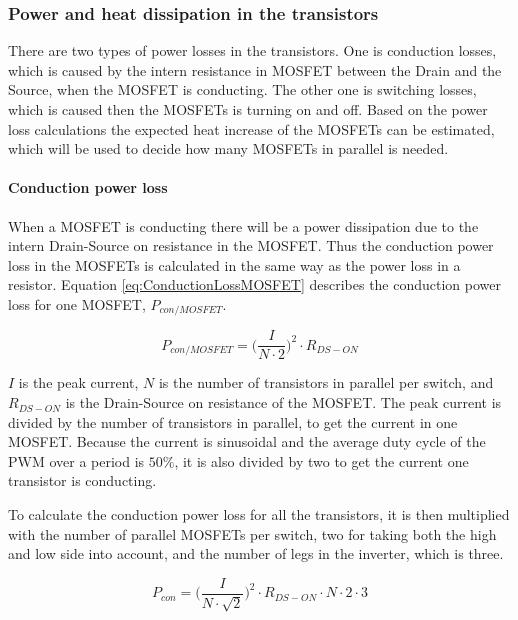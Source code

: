 \subsubsection{Power and heat dissipation in the transistors}
There are two types of power losses in the transistors. One is conduction losses, which is caused by the intern resistance in MOSFET between the Drain and the Source, when the MOSFET is conducting. The other one is switching losses, which is caused then the MOSFETs is turning on and off. Based on the power loss calculations the expected heat increase of the MOSFETs can be estimated, which will be used to decide how many MOSFETs in parallel is needed.

\paragraph{Conduction power loss}
When a MOSFET is conducting there will be a power dissipation due to the intern Drain-Source on resistance in the MOSFET. Thus the conduction power loss in the MOSFETs is calculated in the same way as the power loss in a resistor. Equation \ref{eq:ConductionLossMOSFET} describes the conduction power loss for one MOSFET, $P_{con/MOSFET}$.

    \begin{equation}
        P_{con/MOSFET} = \bigg( \frac{I}{N \cdot 2} \bigg) ^2 \cdot R_{DS-ON}
        \label{eq:ConductionLossMOSFET}
    \end{equation}

$I$ is the peak current, $N$ is the number of transistors in parallel per switch, and $R_{DS-ON}$ is the Drain-Source on resistance of the MOSFET.
The peak current is divided by the number of transistors in parallel, to get the current in one MOSFET. Because the current is sinusoidal and the average duty cycle of the PWM over a period is $50 \% $, it is also divided by two to get the current one transistor is conducting.

To calculate the conduction power loss for all the transistors, it is then multiplied with the number of parallel MOSFETs per switch, two for taking both the high and low side into account, and the number of legs in the inverter, which is three.

    \begin{equation}
        P_{con} = \bigg( \frac{I}{N \cdot \sqrt{2}} \bigg) ^2 \cdot R_{DS-ON} \cdot N \cdot 2 \cdot 3
        \label{eq:ConductionLossTot}
    \end{equation}

